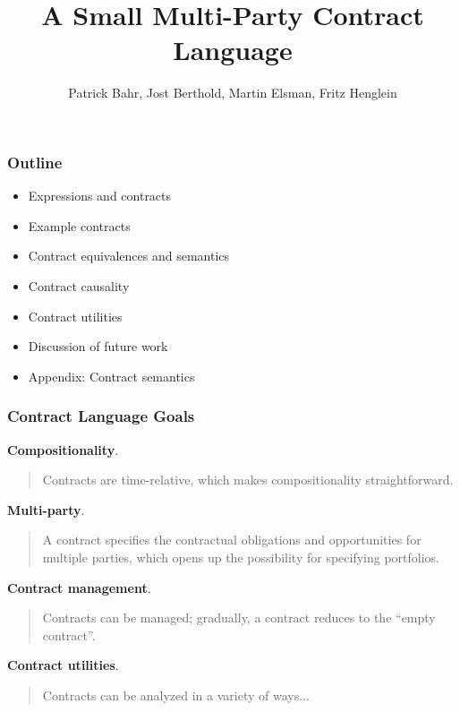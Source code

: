 \documentclass[xcolor=dvipsnames,11pt]{beamer}
\title{A Small Multi-Party Contract Language}
\author[Bahr,Berthold,Elsman,Henglein]{Patrick Bahr, Jost Berthold, Martin Elsman, Fritz Henglein}
\begin{document}
\frame[plain]{\titlepage}

\begin{frame}[fragile,t]
    \frametitle{Outline}

\begin{itemize}
\item Expressions and contracts
\item Example contracts
\item Contract equivalences and semantics
\item Contract causality
\item Contract utilities
\item Discussion of future work\\
\item Appendix: Contract semantics
\end{itemize}
\end{frame}

\begin{frame}[fragile,t]
    \frametitle{Contract Language Goals}

\textbf{Compositionality}. 
\begin{quote}
Contracts are time-relative, which makes compositionality
straightforward.
\end{quote}

\textbf{Multi-party}.
\begin{quote}
A contract specifies the contractual obligations and opportunities for
multiple parties, which opens up the possibility for specifying
portfolios.
\end{quote}

\textbf{Contract management}.
\begin{quote}
Contracts can be managed; gradually, a contract reduces to the ``empty
contract''.
\end{quote}

\textbf{Contract utilities}.
\begin{quote}
Contracts can be analyzed in a variety of ways...
\end{quote}

\end{frame} 
\end{document}
